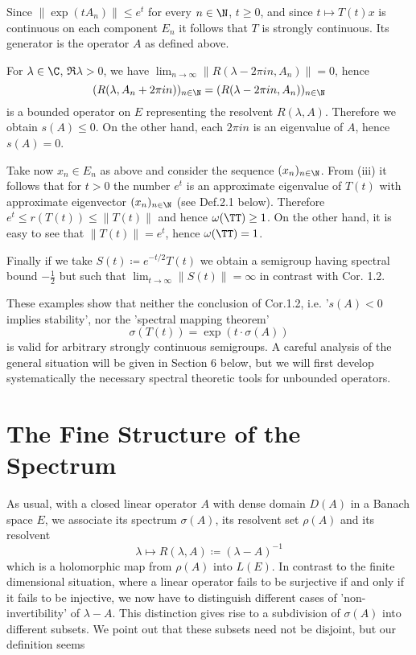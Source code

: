 \newpage

Since $\|\exp(tA_{n})\| \leq e^{t}$ for every $n \in \N$, $t \geq 0$, and since $t \mapsto T(t)x$ is continuous on each component $E_{n}$ it follows that $T$ is strongly continuous.
Its generator is the operator $A$ as defined above.

For $\lambda \in \C$, $\Re\lambda > 0$, we have $\lim_{n \to \infty} \|R(\lambda-2\pi in,A_{n})\| = 0$, hence
\[
    (R(\lambda,A_{n}+2\pi in))_{n \in \N} = (R(\lambda-2\pi in,A_{n}))_{n \in \N}
\]
is a bounded operator on $E$ representing the resolvent $R(\lambda,A)$.
Therefore we obtain $s(A) \leq 0$.
On the other hand, each $2\pi in$ is an eigenvalue of $A$, hence $s(A) = 0$.

Take now $x_{n} \in E_{n}$ as above and consider the sequence $(x_{n})_{n \in \N}$.
From (iii) it follows that for $t > 0$ the number $e^{t}$ is an approximate eigenvalue of $T(t)$ with approximate eigenvector $(x_{n})_{n \in \N}$ (see Def.2.1 below).
Therefore $e^{t} \leq r(T(t)) \leq \|T(t)\|$ and hence $\omega(\TT) \geq 1$.
On the other hand, it is easy to see that $\|T(t)\| = e^{t}$, hence $\omega(\TT) = 1$.


Finally if we take $S(t) \coloneqq e^{-t/2}T(t)$ we obtain a semigroup having spectral bound $-\frac{1}{2}$ but such that $\lim_{t \to \infty} \|S(t)\| = \infty$ in contrast with Cor. 1.2.

These examples show that neither the conclusion of Cor.1.2, i.e. '$s(A) < 0$ implies stability', nor the 'spectral mapping theorem'
\[
    \sigma(T(t)) = \exp(t\cdot\sigma(A))
\]
is valid for arbitrary strongly continuous semigroups.
A careful analysis of the general situation will be given in Section 6 below, but we will first develop systematically the necessary spectral theoretic tools for unbounded operators.
\section{The Fine Structure of the Spectrum}\label{sec:a3-2}

As usual, with a closed linear operator $A$ with dense domain $D(A)$ in a Banach space $E$, we associate its spectrum $\sigma(A)$, its resolvent set $\rho(A)$ and its resolvent
\[
    \lambda \mapsto R(\lambda,A) \coloneqq (\lambda - A)^{-1}
\]
which is a holomorphic map from $\rho(A)$ into $L(E)$.
In contrast to the finite dimensional situation, where a linear operator fails to be surjective if and only if it fails to be injective, we now have to distinguish different cases of 'non-invertibility' of $\lambda - A$.
This distinction gives rise to a subdivision of $\sigma(A)$ into different subsets.
We point out that these subsets need not be disjoint, but our definition seems


